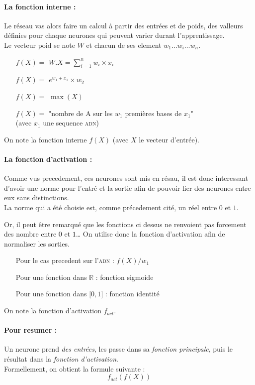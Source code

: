 \paragraph{La fonction interne :}
Le réseau vas alors faire un calcul à partir des entrées et de poids,
des valleurs définies pour chaque neurones qui peuvent varier durant l'apprentissage. \\
Le vecteur poid se note $W$ et chacun de ses element $w_1 \ldots w_i \ldots w_n$.

\exemle
{
\begin{itemize}
    \item[$f(X) =$] $W.X = \sum_{i=1}^{n} w_i \times x_i $
    \item[$f(X) =$] $e^{w_1 + x_1} \times w_2$
    \item[$f(X) =$] $\max(X)$
    \item[$f(X) =$] "nombre de A sur les $w_1$ premières bases de $x_1$" \\
            (avec $x_1$ une sequence \textsc{adn})
\end{itemize}
}
On note la fonction interne $f(X)$ (avec $X$ le vecteur d'entrée).

\paragraph{La fonction d'activation :}
Comme vus precedement, ces neurones sont mis en résau,
il est donc interessant d'avoir une norme pour l'entré et la sortie
afin de pouvoir lier des neurones entre eux sans distinctions. \\
La norme qui a été choisie est, comme précedement cité, un réel entre $0$ et $1$.


Or, il peut être remarqué que les fonctions ci dessus ne renvoient pas forcement des nombre entre $0$ et $1$\ldots
On utilise donc la fonction d'activation afin de normaliser les sorties.
\exemle
{
\begin{itemize}
    \item[Pour le cas precedent sur l'\textsc{adn} :] $f(X)/w_1$
    \item[Pour une fonction dans $\mathbb{R}$ :] fonction sigmoide
    \item[Pour une fonction dans $[0, 1 \rbrack$ :] fonction identité
\end{itemize}
}
On note la fonction d'activation $f_{act}$.


\paragraph{Pour resumer :}
Un neurone prend \textit{des entrées},
les passe dans sa \textit{fonction principale},
puis le résultat dans la \textit{fonction d'activation}. \\
Formellement, on obtient la formule suivante :
\begin{equation}
    f_{act}(f(X))
\end{equation}


